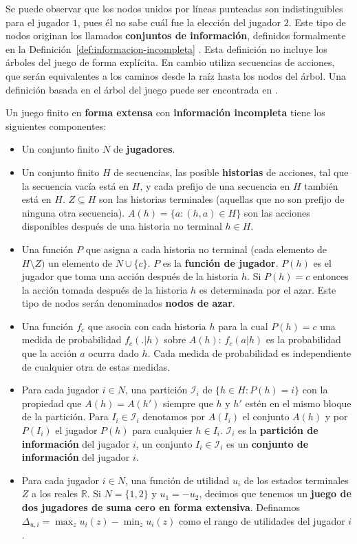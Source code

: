 Se puede observar que los nodos unidos por líneas punteadas son indistinguibles para el jugador $1$, pues él no sabe cuál fue la elección del jugador $2$. Este tipo de nodos originan los llamados \textbf{conjuntos de información}, definidos formalmente en la Definición~\ref{def:informacion-incompleta} \cite[p.~200]{bib:course-game-theory}. Esta definición no incluye los árboles del juego de forma explícita. En cambio utiliza secuencias de acciones, que serán equivalentes a los caminos desde la raíz hasta los nodos del árbol. Una definición basada en el árbol del juego puede ser encontrada en \cite{bib:conceptos-basicos}.

\begin{definition}
\label{def:informacion-incompleta}
Un juego finito en \textbf{forma extensa} con \textbf{información incompleta} tiene los siguientes componentes:
\begin{itemize}[noitemsep]
  \item Un conjunto finito $N$ de \textbf{jugadores}.
  \item Un conjunto finito $H$ de secuencias, las posible \textbf{historias} de acciones, tal que la secuencia vacía está en $H$, y cada prefijo de una secuencia en $H$ también está en $H$. $Z \subseteq H$ son las historias terminales (aquellas que no son prefijo de ninguna otra secuencia). $A(h) = \{ a : (h, a) \in H \}$ son las acciones disponibles después de una historia no terminal $h \in H$.
  \item Una función $P$ que asigna a cada historia no terminal (cada elemento de $H \setminus Z)$ un elemento de $N \cup \{c \}$. $P$ es la \textbf{función de jugador}. $P(h)$ es el jugador que toma una acción después de la historia $h$. Si $P(h) = c$ entonces la acción tomada después de la historia $h$ es determinada por el azar. Este tipo de nodos serán denominados \textbf{nodos de azar}.
  \item Una función $f_c$ que asocia con cada historia $h$ para la cual $P(h) = c$ una medida de probabilidad $f_c(.|h)$ sobre $A(h)$: $f_c(a|h)$ es la probabilidad que la acción $a$ ocurra dado $h$.  Cada medida de probabilidad es independiente de cualquier otra de estas medidas.
  \item Para cada jugador $i \in N$, una partición $\mathcal{I}_i$ de $\{h \in H : P(h) = i\}$ con la propiedad que $A(h) = A(h')$ siempre que $h$ y $h'$ estén en el mismo bloque de la partición. Para $I_i \in \mathcal{I}_i$ denotamos por $A(I_i)$ el conjunto $A(h)$ y por $P(I_i)$ el jugador $P(h)$ para cualquier $h \in I_i$. $\mathcal{I}_i$ es la \textbf{partición de información} del jugador $i$, un conjunto $I_i \in \mathcal{I}_i$ es un \textbf{conjunto de información} del jugador $i$.
  \item Para cada jugador $i \in N$, una función de utilidad $u_i$ de los estados terminales $Z$ a los reales $\mathbb{R}$. Si $N = \{1,2\}$ y $u_1 = -u_2$, decimos que tenemos un \textbf{juego de dos jugadores de suma cero en forma extensiva}. Definamos $\Delta_{u,i} = \max_z u_i(z) - \min_z u_i(z)$ como el rango de utilidades del jugador $i$.
\end{itemize}
\end{definition}

